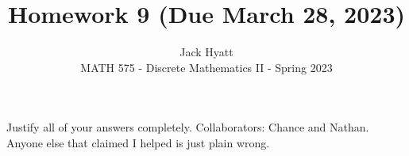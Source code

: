 \documentclass[12pt]{article}
\begin{document}
	
	
	
	\title{Homework 9 (Due March 28, 2023)}
	\author{Jack Hyatt\\ %
		MATH 575 - Discrete Mathematics II - Spring 2023} 
	
	\maketitle
	
	Justify all of your answers completely.\m
	Collaborators: Chance and Nathan. Anyone else that claimed I helped is just plain wrong.
	
	
	\medskip 
	
\end{document}
